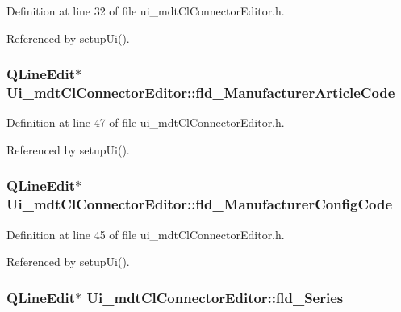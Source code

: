 Definition at line 32 of file ui\-\_\-mdt\-Cl\-Connector\-Editor.\-h.



Referenced by setup\-Ui().

\hypertarget{class_ui__mdt_cl_connector_editor_ad853e594ea263ea1c72af78601db4838}{
\subsubsection[{fld\-\_\-\-Manufacturer\-Article\-Code}]{\setlength{\rightskip}{0pt plus 5cm}Q\-Line\-Edit$\ast$ Ui\-\_\-mdt\-Cl\-Connector\-Editor\-::fld\-\_\-\-Manufacturer\-Article\-Code}}\label{class_ui__mdt_cl_connector_editor_ad853e594ea263ea1c72af78601db4838}


Definition at line 47 of file ui\-\_\-mdt\-Cl\-Connector\-Editor.\-h.



Referenced by setup\-Ui().

\hypertarget{class_ui__mdt_cl_connector_editor_a4c0d4e3512774a28963057b51f1fe56c}{
\subsubsection[{fld\-\_\-\-Manufacturer\-Config\-Code}]{\setlength{\rightskip}{0pt plus 5cm}Q\-Line\-Edit$\ast$ Ui\-\_\-mdt\-Cl\-Connector\-Editor\-::fld\-\_\-\-Manufacturer\-Config\-Code}}\label{class_ui__mdt_cl_connector_editor_a4c0d4e3512774a28963057b51f1fe56c}


Definition at line 45 of file ui\-\_\-mdt\-Cl\-Connector\-Editor.\-h.



Referenced by setup\-Ui().

\hypertarget{class_ui__mdt_cl_connector_editor_a8c98d5a3b9de692d79f01b636f643538}{
\subsubsection[{fld\-\_\-\-Series}]{\setlength{\rightskip}{0pt plus 5cm}Q\-Line\-Edit$\ast$ Ui\-\_\-mdt\-Cl\-Connector\-Editor\-::fld\-\_\-\-Series}}\label{class_ui__mdt_cl_connector_editor_a8c98d5a3b9de692d79f01b636f643538}


